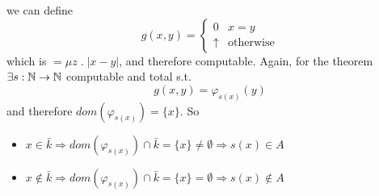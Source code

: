 \begin{counterexample}
\begin{enumerate}
    we can define
    \[
      g(x,y) = \begin{cases}
        0        & x=y \\
        \uparrow & \mbox{otherwise}
      \end{cases}
    \]
    which is $= \mu z \; . \; |x-y|$, and therefore computable. Again,
    for the \smn theorem $\exists s : \mathbb{N} \rightarrow \mathbb{N}$ computable and total
    s.t.
    \[
      g(x,y) = \varphi_{s(x)}(y)
    \]
    and therefore $dom(\varphi_{s(x)}) = \{x\}$. So
    \begin{itemize}
    \item
      \(x \in \bar{k} \Rightarrow dom(\varphi_{s(x)}) \cap \bar{k} =
      \{x\} \neq \emptyset \Rightarrow s(x) \in A\)
    \item
      \(x \notin \bar{k} \Rightarrow dom(\varphi_{s(x)}) \cap \bar{k}
      = \{x\} = \emptyset \Rightarrow s(x) \notin A\)
    \end{itemize}
  \end{enumerate}
\end{counterexample}
